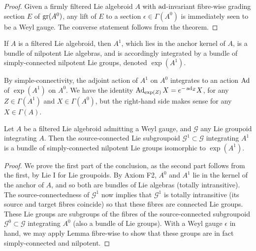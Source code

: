 \documentclass[leqno,12pt]{amsart} %
\begin{document}
\begin{proof}
  Given a firmly filtered Lie algebroid $A$ with $\operatorname{ad}$-invariant fibre-wise grading
  section $E$ of $\operatorname{\operatorname{gr}}(A^0)$, any lift of $E$ to a section $\epsilon \in \Gamma(A^0)$
  is immediately seen to be a Weyl gauge. The converse statement follows from the theorem.
\end{proof}

If $A$ is a filtered Lie algebroid, then $A^1$, which lies in the anchor kernel of $A$, is
a bundle of nilpotent Lie algebras, and is accordingly integrated by a bundle of
simply-connected nilpotent Lie groups, denoted $\exp(A^1)$.

\begin{remark}
  By simple-connectivity, the adjoint action of $A^1$ on $A^0$ integrates to an action
  $\operatorname{Ad}$ of $\exp(A^1)$ on $A^0$. We have the identity
  $\operatorname{Ad}_{\exp(Z)}X=e^{-\operatorname{ad}_Z}X$, for any $Z \in \Gamma(A^1)$ and
  $X \in \Gamma(A^0)$, but the right-hand side makes sense for any $X \in \Gamma(A)$.
\end{remark}

\begin{proposition}
  Let $A$ be a filtered Lie algebroid admitting a Weyl gauge, and ${\mathcal G} $ any Lie
  groupoid integrating $A$. Then the source-connected Lie subgroupoid
  ${\mathcal G}^1 \subset {\mathcal G} $ integrating $A^1$ is a bundle of simply-connected
  nilpotent Lie groups isomorphic to $\exp(A^1)$.
\end{proposition}

\begin{proof}
  We prove the first part of the conclusion, as the second part follows from the first, by
  Lie I for Lie groupoids. By Axiom F2, $A^0$ and $A^1$ lie in the kernel of the anchor of
  $A$, and so both are bundles of Lie algebras (totally intransitive). The
  source-connectedness of ${\mathcal G}^1$ now implies that ${\mathcal G}^1 $ is totally
  intransitive (its source and target fibres coincide) so that these fibres are connected
  Lie groups. These Lie groups are subgroups of the fibres of the source-connected
  subgroupoid ${\mathcal G}^0 \subset {\mathcal G}$ integrating $A^0$ (also a bundle of
  Lie groups). With a Weyl gauge $\epsilon$ in hand, we may apply Lemma
   fibre-wise to show that these groups are in fact
  simply-connected and nilpotent.
\end{proof}
\end{document}
